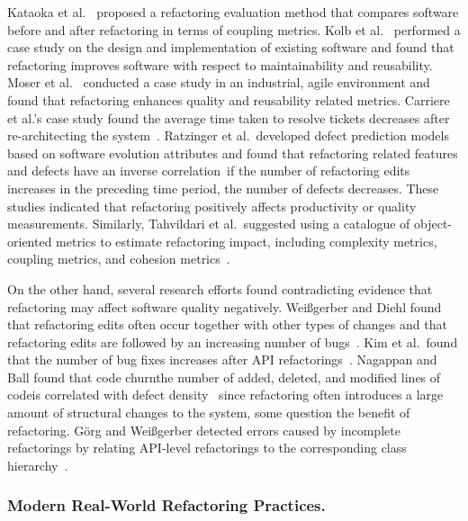 \documentclass[runningheads,a4paper]{llncs}
\begin{document}
Kataoka et al.~\cite{Kataoka2002:metric} proposed a refactoring evaluation method that compares software before and after refactoring in terms of coupling metrics. Kolb et al.~\cite{Kolb2006:refactoring} performed a case study on the design and implementation of existing software and found that refactoring improves software with respect to maintainability and reusability. Moser et al.~\cite{Moser2006:refactoring} conducted a case study in an industrial, agile environment and found that refactoring enhances quality and reusability related metrics. Carriere et al.'s case study found the average time taken to resolve tickets decreases after re-architecting the system~\cite{Carriere2010:architecture}. Ratzinger et al.~developed defect prediction models based on software evolution attributes and found that refactoring related features and defects have an inverse correlation~\cite{Ratzinger2008:refactor}\textemdash if the number of refactoring edits increases in the preceding time period, the number of defects decreases. These studies indicated that refactoring positively affects productivity or quality measurements. Similarly, Tahvildari et al.~suggested using a catalogue of object-oriented metrics to estimate refactoring impact, including complexity metrics, coupling metrics, and cohesion metrics~\cite{Tahvildari2003:MAE}. 

On the other hand, several research efforts found contradicting evidence that refactoring may affect software quality negatively. Wei{\ss}gerber and Diehl found that refactoring edits often occur together with other types of changes and that refactoring edits are followed by an increasing number of bugs~\cite{Weissgerber2006:refactor}.  Kim et al.~found that the number of bug fixes increases after API refactorings~\cite{Kim2011:refactorbug}.  Nagappan and Ball found that code churn\textemdash the number of added, deleted, and modified lines of code\textemdash is correlated with defect density~\cite{Nagappan2005}\textemdash{} since refactoring often introduces a large amount of structural changes to the system, some question the benefit of refactoring. G{\"o}rg and Wei{\ss}gerber detected errors caused by incomplete refactorings by relating API-level refactorings to the corresponding class hierarchy~\cite{Weissgerber2006:refactor}.  

\subsubsection{Modern Real-World Refactoring Practices.} 
\end{document}
